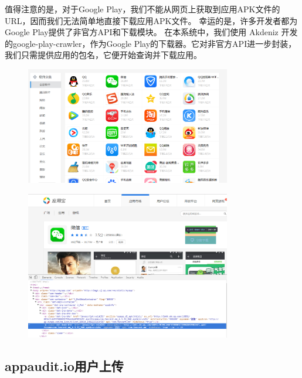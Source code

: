 值得注意的是，对于Google Play，我们不能从网页上获取到应用APK文件的URL，因而我们无法简单地直接下载应用APK文件。
幸运的是，许多开发者都为Google Play提供了非官方API和下载模块。
在本系统中，我们使用 Akdeniz 开发的google-play-crawler，作为Google Play的下载器。它对非官方API进一步封装，我们只需提供应用的包名，它便开始查询并下载应用。

\begin{figure}
	\centering
	\includegraphics[width=0.8\textwidth]{figure/myapp-popular.png}
\end{figure}

\begin{figure}
	\centering
	\includegraphics[width=0.8\textwidth]{figure/wechat-detail.png}
\end{figure}


\subsection{appaudit.io用户上传}

